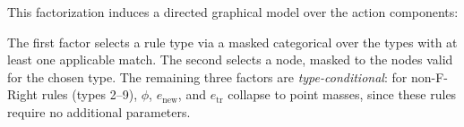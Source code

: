 \documentclass[11pt,a4paper]{article}
\begin{document}
\noindent
This factorization induces a directed graphical model over the action
components:

\begin{center}
\end{center}

The first factor selects a rule type via a masked categorical over the
types with at least one applicable match.  The second selects a node,
masked to the nodes valid for the chosen type.  The remaining three
factors are \emph{type-conditional}: for non-F-Right rules (types 2--9),
$\phi$, $e_{\mathrm{new}}$, and $e_{\mathrm{tr}}$ collapse to point
masses, since these rules require no additional parameters.
\end{document}
